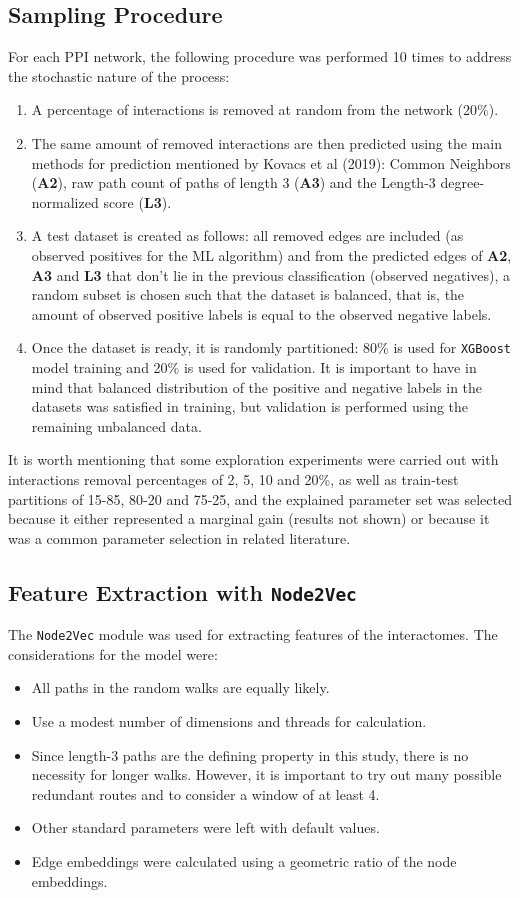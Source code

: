 \subsection*{Sampling Procedure}

For each PPI network, the following procedure was performed 10 times
to address the stochastic nature of the process:
\begin{enumerate}
\item A percentage of interactions is removed at random from the network
(20\%).
\item The same amount of removed interactions are then predicted using the
main methods for prediction mentioned by Kovacs et al (2019): Common
Neighbors (\textbf{A2}), raw path count of paths of length 3 (\textbf{A3})
and the Length-3 degree-normalized score (\textbf{L3}).
\item A test dataset is created as follows: all removed edges are included
(as observed positives for the ML algorithm) and from the predicted
edges of \textbf{A2}, \textbf{A3} and \textbf{L3} that don't lie in
the previous classification (observed negatives), a random subset
is chosen such that the dataset is balanced, that is, the amount of
observed positive labels is equal to the observed negative labels.
\item Once the dataset is ready, it is randomly partitioned: 80\% is used
for \texttt{XGBoost} model training and 20\% is used for validation.
It is important to have in mind that balanced distribution of the
positive and negative labels in the datasets was satisfied in training,
but validation is performed using the remaining unbalanced data.
\end{enumerate}
It is worth mentioning that some exploration experiments were carried
out with interactions removal percentages of 2, 5, 10 and 20\%, as
well as train-test partitions of 15-85, 80-20 and 75-25, and the explained
parameter set was selected because it either represented a marginal
gain (results not shown) or because it was a common parameter selection
in related literature.

\subsection*{Feature Extraction with \texttt{Node2Vec}}

The \texttt{Node2Vec} module was used for extracting features of the
interactomes. The considerations for the model were:
\begin{itemize}
\item All paths in the random walks are equally likely.
\item Use a modest number of dimensions and threads for calculation.
\item Since length-3 paths are the defining property in this study, there
is no necessity for longer walks. However, it is important to try
out many possible redundant routes and to consider a window of at
least 4.
\item Other standard parameters were left with default values.
\item Edge embeddings were calculated using a geometric ratio of the node
embeddings.
\end{itemize}

